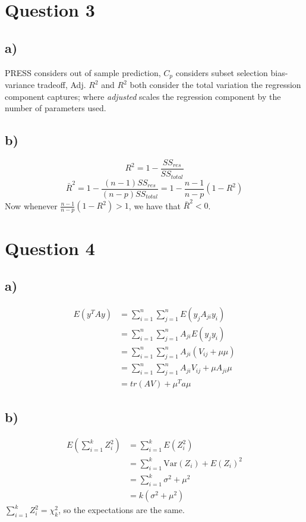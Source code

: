 \documentclass{article}
\begin{document}
\section*{Question 3}
\subsection*{a)}
PRESS considers out of sample prediction, $C_p$ considers subset selection bias-variance tradeoff, Adj. $R^2$ and $R^2$
both consider the total variation the regression component captures; where \textit{adjusted} scales the
regression component by the number of parameters used.

\subsection*{b)}
$$ R^2 = 1 - \frac{SS_{res}}{SS_{total}}$$
$$ \bar{R}^2 = 1 - \frac{(n-1)SS_{res}}{(n-p)SS_{total}} = 1 - \frac{n-1}{n-p}(1 - R^2)$$
Now whenever $\frac{n-1}{n-p}(1-R^2) > 1$, we have that $\bar{R}^2 < 0$.

\section*{Question 4}
\subsection*{a)}
\begin{align*}
    E(y^TAy) &= \sum_{i=1}^n\sum_{j=1}^n E(y_{j}A_{ji}y_{i}) \\ 
    &= \sum_{i=1}^n\sum_{j=1}^n A_{ji}E(y_jy_i) \\ 
    &= \sum_{i=1}^n\sum_{j=1}^n A_{ji}(V_{ij} + \mu\mu) \\ 
    &= \sum_{i=1}^n\sum_{j=1}^n A_{ji}V_{ij} + \mu A_{ji}\mu \\
    &= tr(AV) + \mu^Ta\mu
\end{align*}
\subsection*{b)}
\begin{align*}
    E\left(\sum_{i=1}^kZ_{i}^2\right) &= \sum_{i=1}^kE(Z_{i}^2) \\ 
    &= \sum_{i=1}^k \text{Var}(Z_i) + E(Z_i)^2 \\
    &= \sum_{i=1}^k \sigma^2 + \mu^2 \\ 
    &= k(\sigma^2 + \mu^2)
\end{align*}
$\sum_{i=1}^k Z_i^2 = \chi_k^2$, so the expectations are the same.
\newpage
\end{document}
